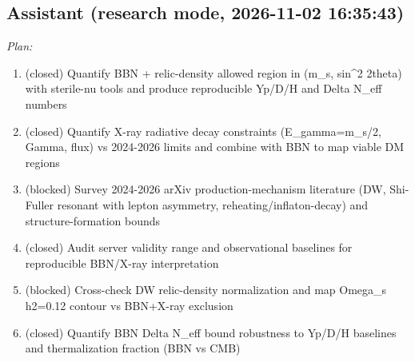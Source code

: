 \documentclass[11pt,a4paper]{article}
\begin{document}
\subsection*{Assistant \small(research mode, 2026-11-02 16:35:43)}
\textit{Plan:}\begin{enumerate}
  \item (closed) Quantify BBN + relic-density allowed region in (m\_s, sin\textasciicircum{}2 2theta) with sterile-nu tools and produce reproducible Yp/D/H and Delta N\_eff numbers
  \item (closed) Quantify X-ray radiative decay constraints (E\_gamma=m\_s/2, Gamma, flux) vs 2024-2026 limits and combine with BBN to map viable DM regions
  \item (blocked) Survey 2024-2026 arXiv production-mechanism literature (DW, Shi-Fuller resonant with lepton asymmetry, reheating/inflaton-decay) and structure-formation bounds
  \item (closed) Audit server validity range and observational baselines for reproducible BBN/X-ray interpretation
  \item (blocked) Cross-check DW relic-density normalization and map Omega\_s h2=0.12 contour vs BBN+X-ray exclusion
  \item (closed) Quantify BBN Delta N\_eff bound robustness to Yp/D/H baselines and thermalization fraction (BBN vs CMB)
\end{enumerate}
\end{document}
